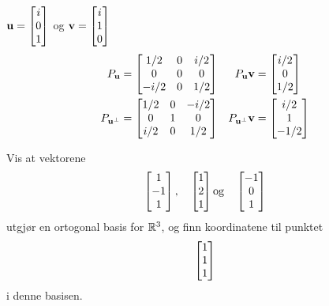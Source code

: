\begin{losning}
\begin{punkt}
$\mathbf{u}=\begin{bmatrix} i \\ 0 \\ 1 \end{bmatrix}$ og $\mathbf{v}=\begin{bmatrix} i \\ 1 \\ 0 \end{bmatrix}$\\[4pt]
\vspace{-15pt}
\begin{align*}
P_{\mathbf{u}}
&=
\begin{bmatrix}
1/2  & 0 & i/2 \\
0    & 0 & 0   \\
-i/2 & 0 & 1/2
\end{bmatrix}
&
P_{\mathbf{u}} \mathbf{v} &= \begin{bmatrix} i/2 \\ 0 \\ 1/2 \end{bmatrix}
\\
P_{\mathbf{u}^\perp}
&=
\begin{bmatrix}
1/2  & 0 & -i/2 \\
0    & 1 & 0    \\
i/2  & 0 & 1/2
\end{bmatrix}
&
P_{\mathbf{u}^\perp} \mathbf{v} &= \begin{bmatrix} i/2 \\ 1 \\ -1/2 \end{bmatrix}
\end{align*}
\end{punkt}
\end{losning}


\begin{oppgave}
Vis at vektorene 
\[
\begin{bmatrix} 1 \\ -1 \\ 1 \end{bmatrix}, \quad \begin{bmatrix} 1 \\ 2 \\ 1 \end{bmatrix} \text{og} \quad \begin{bmatrix} -1 \\ 0 \\ 1 \end{bmatrix}
\]
utgjør en ortogonal basis for $\mathbb{R}^3$, og finn koordinatene til punktet
\[
\begin{bmatrix} 1 \\ 1 \\ 1 \end{bmatrix}
\]
i denne basisen.
\end{oppgave}



%
%
%


